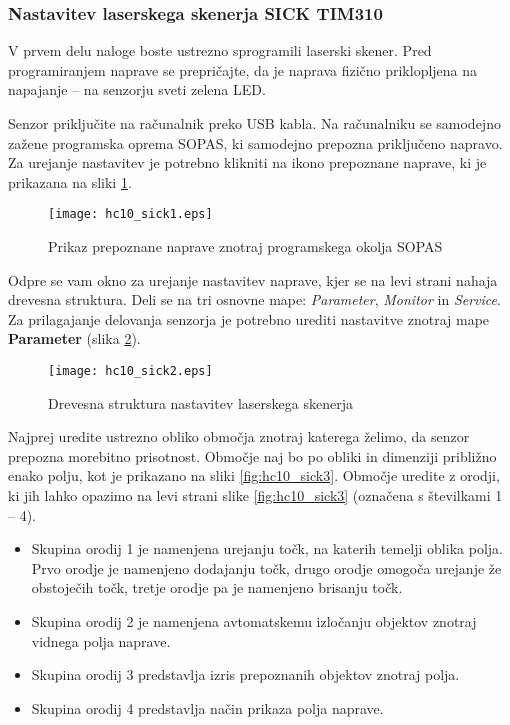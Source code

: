 \subsubsection*{Nastavitev laserskega skenerja SICK TIM310}

V prvem delu naloge boste ustrezno sprogramili laserski skener. Pred programiranjem naprave se prepričajte, da je naprava fizično priklopljena na napajanje -- na senzorju sveti zelena LED.

Senzor priključite na računalnik preko USB kabla. Na računalniku se samodejno zažene programska oprema SOPAS, ki samodejno prepozna priključeno napravo. Za urejanje nastavitev je potrebno klikniti na ikono prepoznane naprave, ki je prikazana na sliki \ref{fig:hc10_sick1}.

\begin{figure}[!hbt]
	\centering
	\texttt{[image: hc10\_sick1.eps]}
	\caption{Prikaz prepoznane naprave znotraj programskega okolja SOPAS}
	\label{fig:hc10_sick1}
\end{figure}

Odpre se vam okno za urejanje nastavitev naprave, kjer se na levi strani nahaja drevesna struktura. Deli se na tri osnovne mape: \emph{Parameter}, \emph{Monitor} in \emph{Service}. Za prilagajanje delovanja senzorja je potrebno urediti nastavitve znotraj mape \textbf{Parameter} (slika \ref{fig:hc10_sick2}).

\begin{figure}[!hbt]
	\centering
	\texttt{[image: hc10\_sick2.eps]}
	\caption{Drevesna struktura nastavitev laserskega skenerja}
	\label{fig:hc10_sick2}
\end{figure}

Najprej uredite ustrezno obliko območja znotraj katerega želimo, da senzor prepozna morebitno prisotnost. Območje naj bo po obliki in dimenziji približno enako polju, kot je prikazano na sliki \ref{fig:hc10_sick3}. Območje uredite z orodji, ki jih lahko opazimo na levi strani slike \ref{fig:hc10_sick3} (označena s številkami 1 -- 4).
\begin{itemize}
	\item Skupina orodij 1 je namenjena urejanju točk, na katerih temelji oblika polja. Prvo orodje je namenjeno dodajanju točk, drugo orodje omogoča urejanje že obstoječih točk, tretje orodje pa je namenjeno brisanju točk.
	\item Skupina orodij 2 je namenjena avtomatskemu izločanju objektov znotraj vidnega polja naprave.
	\item Skupina orodij 3 predstavlja izris prepoznanih objektov znotraj polja.
	\item Skupina orodij 4 predstavlja način prikaza polja naprave.
\end{itemize}

